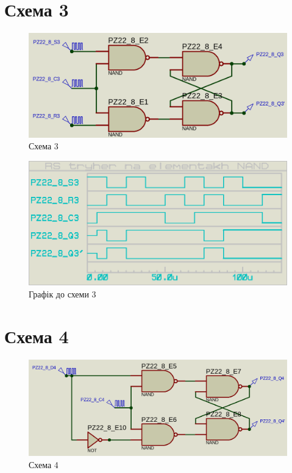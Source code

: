 \documentclass{article}
\begin{document}
\begin{normalsize}
	\section*{Схема 3}	
	\begin{figure}[H]
		\centering
		\includegraphics[scale=0.25]{s3}	
		\caption{Схема 3}
	\end{figure}
	
	\begin{figure}[H]
		\centering
		\includegraphics[scale=0.25]{g3}	
		\caption{Графік до схеми 3}
	\end{figure}

	\section*{Схема 4}	
	\begin{figure}[H]
		\centering
		\includegraphics[scale=0.25]{s4}	
		\caption{Схема 4}
	\end{figure}
	

\end{normalsize}
\end{document}

